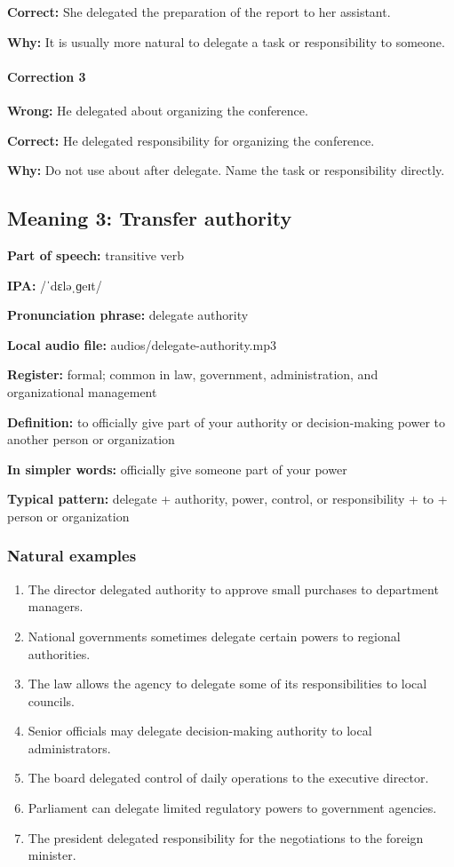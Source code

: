 \documentclass[11pt]{article}
\begin{document}
\textbf{Correct:} She delegated the preparation of the report to her assistant.

\textbf{Why:} It is usually more natural to delegate a task or responsibility to someone.

\paragraph{Correction 3}
\textbf{Wrong:} He delegated about organizing the conference.

\textbf{Correct:} He delegated responsibility for organizing the conference.

\textbf{Why:} Do not use about after delegate. Name the task or responsibility directly.

\subsection{Meaning 3: Transfer authority}
\textbf{Part of speech:} transitive verb

\textbf{IPA:} /ˈdɛləˌɡeɪt/

\textbf{Pronunciation phrase:} delegate authority

\textbf{Local audio file:} audios/delegate-authority.mp3

\textbf{Register:} formal; common in law, government, administration, and organizational management

\textbf{Definition:} to officially give part of your authority or decision-making power to another person or organization

\textbf{In simpler words:} officially give someone part of your power

\textbf{Typical pattern:} delegate + authority, power, control, or responsibility + to + person or organization

\subsubsection{Natural examples}
\begin{enumerate}
  \item The director delegated authority to approve small purchases to department managers.
  \item National governments sometimes delegate certain powers to regional authorities.
  \item The law allows the agency to delegate some of its responsibilities to local councils.
  \item Senior officials may delegate decision-making authority to local administrators.
  \item The board delegated control of daily operations to the executive director.
  \item Parliament can delegate limited regulatory powers to government agencies.
  \item The president delegated responsibility for the negotiations to the foreign minister.
\end{enumerate}
\end{document}
